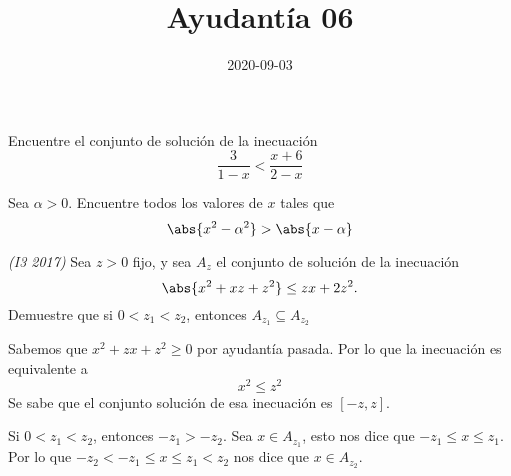 \documentclass{ayudantia}
\title{Ayudantía 06}
\date{2020-09-03}
\begin{document}
\maketitle

\begin{prob}
    Encuentre el conjunto de solución de la inecuación
    \begin{equation*}
        \frac3{1-x}<\frac{x+6}{2-x}
    \end{equation*}
\end{prob}

\begin{ans}
    \begin{sol}

    \end{sol}
\end{ans}


\begin{prob}
    Sea \(\alpha>0\). Encuentre todos los valores de \(x\) tales que
    \begin{equation*}
        \abs{x^2-\alpha^2}>\abs{x-\alpha}
    \end{equation*}
\end{prob}

\begin{ans}
    \begin{sol}

    \end{sol}
\end{ans}



\begin{prob}
    \textit{(I3 2017)} Sea \(z>0\) fijo, y sea \(A_z\) el conjunto de solución de la inecuación
    \begin{equation*}
        \abs{x^2+xz+z^2}\leq zx+2z^2.
    \end{equation*}
    Demuestre que si \(0<z_1<z_2\), entonces \(A_{z_1}\subseteq A_{z_2}\)
\end{prob}

\begin{ans}
    \begin{sol}
        Sabemos que \(x^2+zx+z^2\geq0\) por ayudantía pasada. Por lo que la inecuación es equivalente a
        \begin{equation*}
            x^2\leq z^2
        \end{equation*}
        Se sabe que el conjunto solución de esa inecuación es \([-z,z]\).

        Si \(0<z_1<z_2\), entonces \(-z_1>-z_2\). Sea \(x\in A_{z_1}\), esto nos dice que \(-z_1\leq x\leq z_1\). Por lo que \(-z_2< -z_1\leq x\leq z_1< z_2\) nos dice que \(x\in A_{z_2}\).
    \end{sol}
\end{ans}
\end{document}
